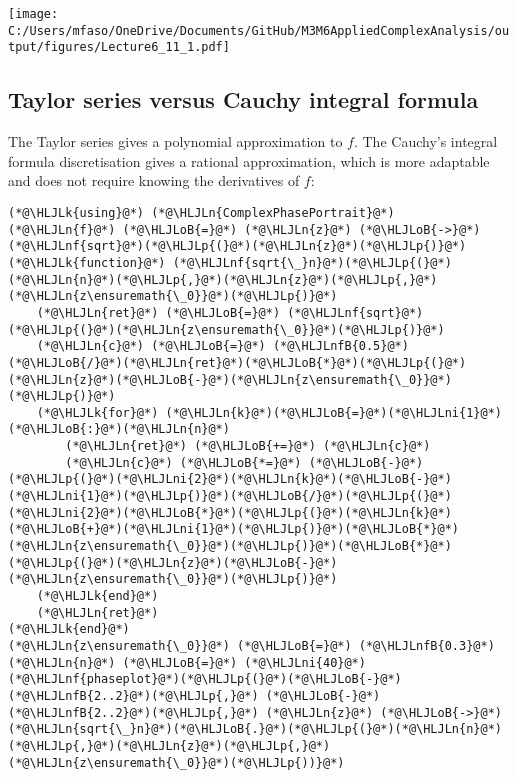 \documentclass[12pt,a4paper]{article}
\newcommand{\HLJLk}[1]{\textcolor[RGB]{148,91,176}{\textbf{#1}}}
\newcommand{\HLJLn}[1]{#1}
\newcommand{\HLJLnf}[1]{\textcolor[RGB]{66,102,213}{#1}}
\newcommand{\HLJLnfB}[1]{\textcolor[RGB]{59,151,46}{#1}}
\newcommand{\HLJLni}[1]{\textcolor[RGB]{59,151,46}{#1}}
\newcommand{\HLJLoB}[1]{\textcolor[RGB]{102,102,102}{\textbf{#1}}}
\newcommand{\HLJLp}[1]{#1}
\begin{document}
\texttt{[image: C:/Users/mfaso/OneDrive/Documents/GitHub/M3M6AppliedComplexAnalysis/output/figures/Lecture6\_11\_1.pdf]}

\subsection{Taylor series versus Cauchy integral formula}
The Taylor series gives a polynomial approximation to $f$. The Cauchy's integral formula discretisation gives a rational approximation, which is more adaptable and does not require knowing the derivatives of $f$:


\begin{lstlisting}
(*@\HLJLk{using}@*) (*@\HLJLn{ComplexPhasePortrait}@*)
(*@\HLJLn{f}@*) (*@\HLJLoB{=}@*) (*@\HLJLn{z}@*) (*@\HLJLoB{->}@*) (*@\HLJLnf{sqrt}@*)(*@\HLJLp{(}@*)(*@\HLJLn{z}@*)(*@\HLJLp{)}@*)
(*@\HLJLk{function}@*) (*@\HLJLnf{sqrt{\_}n}@*)(*@\HLJLp{(}@*)(*@\HLJLn{n}@*)(*@\HLJLp{,}@*)(*@\HLJLn{z}@*)(*@\HLJLp{,}@*)(*@\HLJLn{z\ensuremath{\_0}}@*)(*@\HLJLp{)}@*)
    (*@\HLJLn{ret}@*) (*@\HLJLoB{=}@*) (*@\HLJLnf{sqrt}@*)(*@\HLJLp{(}@*)(*@\HLJLn{z\ensuremath{\_0}}@*)(*@\HLJLp{)}@*)
    (*@\HLJLn{c}@*) (*@\HLJLoB{=}@*) (*@\HLJLnfB{0.5}@*)(*@\HLJLoB{/}@*)(*@\HLJLn{ret}@*)(*@\HLJLoB{*}@*)(*@\HLJLp{(}@*)(*@\HLJLn{z}@*)(*@\HLJLoB{-}@*)(*@\HLJLn{z\ensuremath{\_0}}@*)(*@\HLJLp{)}@*)
    (*@\HLJLk{for}@*) (*@\HLJLn{k}@*)(*@\HLJLoB{=}@*)(*@\HLJLni{1}@*)(*@\HLJLoB{:}@*)(*@\HLJLn{n}@*)
        (*@\HLJLn{ret}@*) (*@\HLJLoB{+=}@*) (*@\HLJLn{c}@*)
        (*@\HLJLn{c}@*) (*@\HLJLoB{*=}@*) (*@\HLJLoB{-}@*)(*@\HLJLp{(}@*)(*@\HLJLni{2}@*)(*@\HLJLn{k}@*)(*@\HLJLoB{-}@*)(*@\HLJLni{1}@*)(*@\HLJLp{)}@*)(*@\HLJLoB{/}@*)(*@\HLJLp{(}@*)(*@\HLJLni{2}@*)(*@\HLJLoB{*}@*)(*@\HLJLp{(}@*)(*@\HLJLn{k}@*)(*@\HLJLoB{+}@*)(*@\HLJLni{1}@*)(*@\HLJLp{)}@*)(*@\HLJLoB{*}@*)(*@\HLJLn{z\ensuremath{\_0}}@*)(*@\HLJLp{)}@*)(*@\HLJLoB{*}@*)(*@\HLJLp{(}@*)(*@\HLJLn{z}@*)(*@\HLJLoB{-}@*)(*@\HLJLn{z\ensuremath{\_0}}@*)(*@\HLJLp{)}@*)
    (*@\HLJLk{end}@*)
    (*@\HLJLn{ret}@*)
(*@\HLJLk{end}@*)
(*@\HLJLn{z\ensuremath{\_0}}@*) (*@\HLJLoB{=}@*) (*@\HLJLnfB{0.3}@*)
(*@\HLJLn{n}@*) (*@\HLJLoB{=}@*) (*@\HLJLni{40}@*)
(*@\HLJLnf{phaseplot}@*)(*@\HLJLp{(}@*)(*@\HLJLoB{-}@*)(*@\HLJLnfB{2..2}@*)(*@\HLJLp{,}@*) (*@\HLJLoB{-}@*)(*@\HLJLnfB{2..2}@*)(*@\HLJLp{,}@*) (*@\HLJLn{z}@*) (*@\HLJLoB{->}@*) (*@\HLJLn{sqrt{\_}n}@*)(*@\HLJLoB{.}@*)(*@\HLJLp{(}@*)(*@\HLJLn{n}@*)(*@\HLJLp{,}@*)(*@\HLJLn{z}@*)(*@\HLJLp{,}@*)(*@\HLJLn{z\ensuremath{\_0}}@*)(*@\HLJLp{))}@*)
\end{lstlisting}
\end{document}
